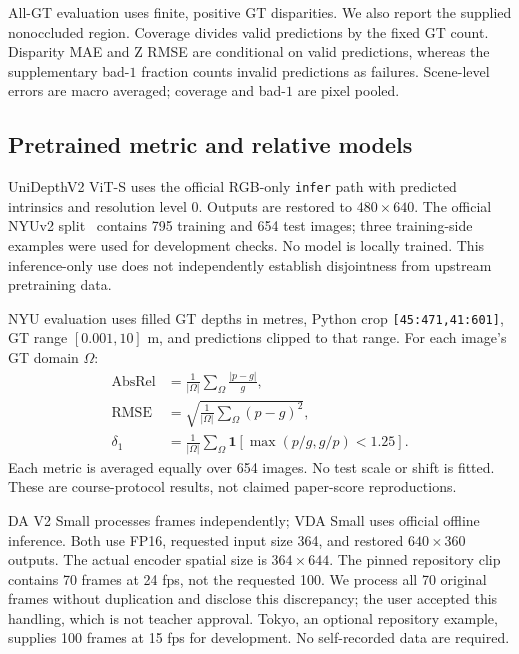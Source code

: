 \documentclass[10pt,twocolumn,letterpaper]{article}
\begin{document}
All-GT evaluation uses finite, positive GT disparities. We also report the supplied nonoccluded region. Coverage divides valid predictions by the fixed GT count. Disparity MAE and Z RMSE are conditional on valid predictions, whereas the supplementary bad-$1$ fraction counts invalid predictions as failures. Scene-level errors are macro averaged; coverage and bad-$1$ are pixel pooled.

\subsection{Pretrained metric and relative models}
UniDepthV2 ViT-S uses the official RGB-only \texttt{infer} path with predicted intrinsics and resolution level 0. Outputs are restored to $480\times640$. The official NYUv2 split~\cite{nyu} contains 795 training and 654 test images; three training-side examples were used for development checks. No model is locally trained. This inference-only use does not independently establish disjointness from upstream pretraining data.

NYU evaluation uses filled GT depths in metres, Python crop \texttt{[45:471,41:601]}, GT range $[0.001,10]$ m, and predictions clipped to that range. For each image's GT domain $\Omega$:
\begin{align}
\mathrm{AbsRel}&=\frac{1}{|\Omega|}\sum_{\Omega}\frac{|p-g|}{g},\\
\mathrm{RMSE}&=\sqrt{\frac{1}{|\Omega|}\sum_{\Omega}(p-g)^2},\\
\delta_1&=\frac{1}{|\Omega|}\sum_{\Omega}
\mathbf{1}\!\left[\max(p/g,g/p)<1.25\right].
\end{align}
Each metric is averaged equally over 654 images. No test scale or shift is fitted. These are course-protocol results, not claimed paper-score reproductions.

DA V2 Small processes frames independently; VDA Small uses official offline inference. Both use FP16, requested input size 364, and restored $640\times360$ outputs. The actual encoder spatial size is $364\times644$. The pinned repository clip contains 70 frames at 24 fps, not the requested 100. We process all 70 original frames without duplication and disclose this discrepancy; the user accepted this handling, which is not teacher approval. Tokyo, an optional repository example, supplies 100 frames at 15 fps for development. No self-recorded data are required.
\end{document}
